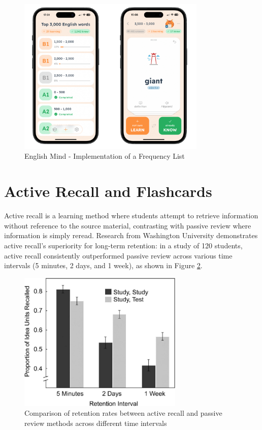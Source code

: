 \begin{figure}[!h]
    \includegraphics[width=0.8\textwidth]{src/figures/em-frequency-list.png}
    \caption{English Mind - Implementation of a Frequency List}
    \label{fig:em-frequency-list}
\end{figure}

\section{Active Recall and Flashcards}
\label{sec:em-active-recall}

Active recall is a learning method where students attempt to retrieve information without reference to the source material, contrasting with passive review where information is simply reread. Research from Washington University \cite{cite:rhkj2006_longterm_retention} demonstrates active recall's superiority for long-term retention: in a study of 120 students, active recall consistently outperformed passive review across various time intervals (5 minutes, 2 days, and 1 week), as shown in Figure \ref{fig:active-recall-passive-review-results}.

\begin{figure}[!h]
    \includegraphics[width=0.7\textwidth]{src/figures/active-recall-passive-review-results.jpeg}
    \caption{Comparison of retention rates between active recall and passive review methods across different time intervals \cite{cite:rhkj2006_longterm_retention}}
    \label{fig:active-recall-passive-review-results}
\end{figure}


